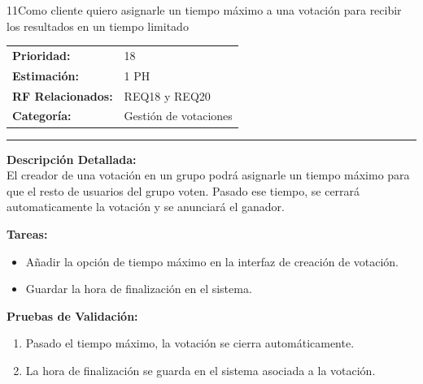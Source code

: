 \begin{hu_card}{11}{Como cliente quiero asignarle un tiempo máximo a una votación para recibir los resultados en un tiempo limitado}
    \begin{tabularx}{\linewidth}{l X}
        \textbf{Prioridad:}   & 18\\
        \textbf{Estimación:}  & 1 PH \\
        \textbf{RF Relacionados:} & REQ18 y REQ20 \\
        \textbf{Categoría:} & Gestión de votaciones \\
    \end{tabularx}

    \vspace{2mm}
    \hrule
    \vspace{2mm}

    \textbf{Descripción Detallada:} \\
    El creador de una votación en un grupo podrá asignarle un tiempo máximo para que el resto de usuarios del grupo voten. Pasado ese tiempo, se cerrará automaticamente la votación y se anunciará el ganador.

    \vspace{2mm}
    \textbf{Tareas:}
    \begin{itemize}[noitemsep, topsep=0pt]
        \item Añadir la opción de tiempo máximo en la interfaz de creación de votación.
        \item Guardar la hora de finalización en el sistema.
    \end{itemize}

    \vspace{2mm}
    \textbf{Pruebas de Validación:}
    \begin{enumerate}[noitemsep, topsep=0pt]
        \item Pasado el tiempo máximo, la votación se cierra automáticamente.
        \item La hora de finalización se guarda en el sistema asociada a la votación.
    \end{enumerate}
\end{hu_card}

